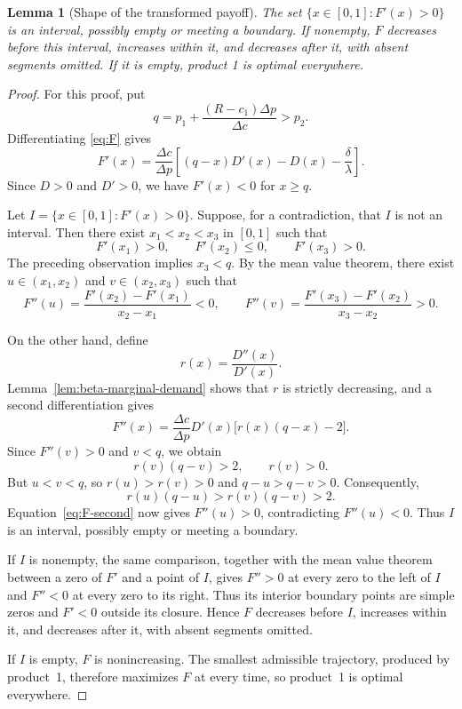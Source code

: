 \documentclass[11pt]{article}
\newtheorem{lemma}{Lemma}
\begin{document}
\begin{lemma}[Shape of the transformed payoff]\label{lem:F-shape}
The set $\{x\in[0,1]:F'(x)>0\}$ is an interval, possibly empty or
meeting a boundary. If nonempty, $F$ decreases before this interval,
increases within it, and decreases after it, with absent segments omitted.
If it is empty, product 1 is optimal everywhere.
\end{lemma}
\begin{proof}
For this proof, put
\begin{equation*}
q=p_1+\frac{(R-c_1)\Delta p}{\Delta c}>p_2.
\end{equation*}
Differentiating \eqref{eq:F} gives
\begin{equation*}
F'(x)=\frac{\Delta c}{\Delta p}
\left[(q-x)D'(x)-D(x)-\frac\delta\lambda\right].
\end{equation*}
Since $D>0$ and $D'>0$, we have $F'(x)<0$ for $x\ge q$.

Let $I=\{x\in[0,1]:F'(x)>0\}$. Suppose, for a contradiction, that
$I$ is not an interval. Then there exist $x_1<x_2<x_3$ in $[0,1]$
such that
\begin{equation*}
F'(x_1)>0,\qquad F'(x_2)\le0,\qquad F'(x_3)>0.
\end{equation*}
The preceding observation implies $x_3<q$. By the mean value theorem,
there exist $u\in(x_1,x_2)$ and $v\in(x_2,x_3)$ such that
\begin{equation*}
F''(u)=\frac{F'(x_2)-F'(x_1)}{x_2-x_1}<0,
\qquad
F''(v)=\frac{F'(x_3)-F'(x_2)}{x_3-x_2}>0.
\end{equation*}

On the other hand, define
\begin{equation*}
r(x)=\frac{D''(x)}{D'(x)}.
\end{equation*}
Lemma~\ref{lem:beta-marginal-demand} shows that $r$ is strictly decreasing,
and a second differentiation gives
\begin{equation}\label{eq:F-second}
F''(x)=\frac{\Delta c}{\Delta p}D'(x)
       \bigl[r(x)(q-x)-2\bigr].
\end{equation}
Since $F''(v)>0$ and $v<q$, we obtain
\begin{equation*}
r(v)(q-v)>2,\qquad r(v)>0.
\end{equation*}
But $u<v<q$, so $r(u)>r(v)>0$ and $q-u>q-v>0$. Consequently,
\begin{equation*}
r(u)(q-u)>r(v)(q-v)>2.
\end{equation*}
Equation~\eqref{eq:F-second} now gives $F''(u)>0$, contradicting
$F''(u)<0$. Thus $I$ is an interval, possibly empty or meeting a boundary.

If $I$ is nonempty, the same comparison, together with the mean value
theorem between a zero of $F'$ and a point of $I$, gives $F''>0$ at
every zero to the left of $I$ and $F''<0$ at every zero to its right.
Thus its interior boundary points are simple zeros and $F'<0$ outside
its closure. Hence $F$ decreases before $I$, increases within it, and
decreases after it, with absent segments omitted.

If $I$ is empty, $F$ is nonincreasing. The smallest admissible trajectory,
produced by product~1, therefore maximizes $F$ at every time, so product~1
is optimal everywhere.
\end{proof}
\end{document}
